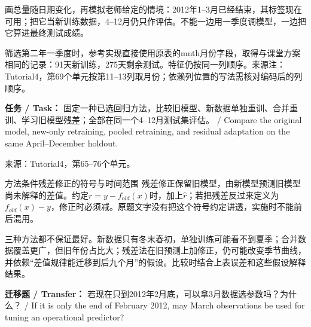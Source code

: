 








画总量随日期变化，再模拟老师给定的情境：2012年1–3月已经结束，其标签现在可用；把它当新训练数据，4–12月仍只作评估。不能一边用一季度调模型，一边把它算进最终测试成绩。


筛选第二年一季度时，参考实现直接使用原表的mnth月份字段，取得与课堂方案相同的记录：91天新训练，275天剩余测试。特征仍按同一列顺序。来源注：Tutorial4，第69个单元按第11–13列取月份；依赖列位置的写法需核对编码后的列顺序。


\textbf{任务 / Task：} 固定一种已选回归方法，比较旧模型、新数据单独重训、合并重训、学习旧模型残差；全部在同一个4–12月测试集评估。 / Compare the original model, new-only retraining, pooled retraining, and residual adaptation on the same April–December holdout.


来源：Tutorial4，第65–76个单元。








\begin{StudyBlock}{方法条件}{残差修正的符号与时间范围}
残差修正保留旧模型，由新模型预测旧模型尚未解释的差值。约定\(r=y-f_{old}(x)\)时，加上\(\hat r\)；若把残差反过来定义为\(f_{old}(x)-y\)，修正时必须减。原题文字没有把这个符号约定讲透，实施时不能前后混用。


三种方法都不保证最好。新数据只有冬末春初，单独训练可能看不到夏季；合并数据覆盖更广，但旧年份占比大；残差法在旧预测上加修正，仍可能改变季节曲线，并依赖“差值规律能迁移到后九个月”的假设。比较时结合上表误差和这些假设解释结果。
\end{StudyBlock}

\textbf{迁移题 / Transfer：} 若现在只到2012年2月底，可以拿3月数据选参数吗？为什么？ / If it is only the end of February 2012, may March observations be used for tuning an operational predictor?



